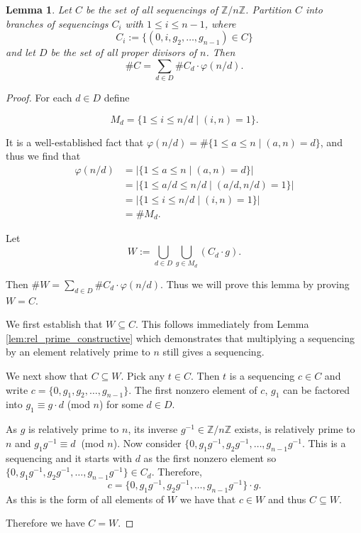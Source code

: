 \documentclass[10pt,a4paper]{amsart}
\newtheorem{lemma}{Lemma}
\newcommand{\ZZ}{\mathbb{Z}}
\begin{document}
\begin{lemma}\label{lem:branch}
Let $C$ be the set of all sequencings of $\ZZ / n\ZZ$. Partition $C$ into branches of sequencings $C_i$ with $1\leq i\leq n-1$, where
\[C_i:= \{(0,i,g_2,\ldots,g_{n-1})\in C \}\]
and let $D$ be the set of all proper divisors of $n$. Then \[\#C = \sum_{d\in D}\#C_d\cdot \varphi(n/d).\]
\end{lemma}

\begin{proof}

For each $d\in D$ define

\[
M_d = \{1 \leq i \leq n/d \mid (i,n)=1\}.
\]

It is a well-established fact that $\varphi(n/d) = \#\{1 \leq a \leq n \mid (a,n)=d\}$, and thus we find that
\begin{align*}
\varphi(n/d) &= \lvert\{1 \leq a \leq n \mid (a,n)=d\}\rvert \\
&=  \lvert  \{ 1 \leq a/d \leq n/d \mid (a/d,n/d)=1\}\rvert \\
&= \lvert \{1 \leq i \leq n/d \mid (i,n)=1\}\rvert \\
&=\# M_d.
\end{align*}


Let \[W:=\bigcup_{d\in D} \bigcup_{g\in M_d} (C_d \cdot g).\]

Then $\#W=\sum_{d\in D}\#C_d\cdot \varphi(n/d)$. Thus we will prove this lemma by proving $W=C$.

We first establish that $W\subseteq C$. This follows immediately from Lemma \ref{lem:rel_prime_constructive} which demonstrates that multiplying a sequencing by an element relatively prime to $n$ still gives a sequencing. 

We next show that $C\subseteq W$. Pick any $t\in C$. Then $t$ is a sequencing $c\in C$ and write $c=\{0,g_1,g_2,\ldots,g_{n-1}\}.$ The first nonzero element of $c$, $g_1$ can be factored into $g_1\equiv g\cdot d$ (mod $n$) for some $d\in D$. 

As $g$ is relatively prime to $n$, its inverse $g^{-1}\in\ZZ/n\ZZ$ exists, is relatively prime to $n$ and $g_1g^{-1}\equiv d\ $ (mod $n$). Now consider
$\{0,g_1g^{-1},g_2g^{-1},\ldots,g_{n-1}g^{-1}$.
This  is a sequencing and it starts with $d$ as the first nonzero element so $\{0,g_1g^{-1},g_2g^{-1},\ldots,g_{n-1}g^{-1}\}\in C_d$. Therefore, \[c=\{0,g_1g^{-1},g_2g^{-1},\ldots,g_{n-1}g^{-1}\}\cdot g.\] As this is the form of all elements of $W$ we have that $c\in W$ and thus $C\subseteq W$.

Therefore we have $C=W$.

\end{proof}
\end{document}
